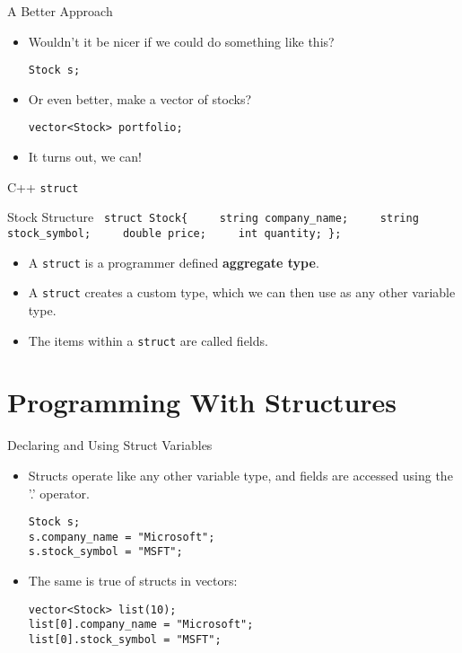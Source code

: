 \documentclass[]{beamer}
\begin{document}
\begin{frame}[fragile]{A Better Approach}
    \begin{itemize}
        \item Wouldn't it be nicer if we could do something like this?
        \begin{verbatim}
Stock s;
        \end{verbatim}
        \item Or even better, make a vector of stocks?
        \begin{verbatim}
vector<Stock> portfolio;
        \end{verbatim}
        \item It turns out, we can!
    \end{itemize}
\end{frame}

\begin{frame}[fragile]{C++ \texttt{struct}}

\begin{block}{Stock Structure}
{\tt
struct Stock\{
\newline\verb!    !string company\_name;
\newline\verb!    !string stock\_symbol;
\newline\verb!    !double price;
\newline\verb!    !int quantity;
\newline\};
}
\end{block}
\begin{itemize}[<+(2)->]
    \item A \texttt{struct} is a programmer defined \textbf{aggregate type}.
    \item A \texttt{struct} creates a custom type, which we can then use as any
        other variable type.
    \item The items within a \texttt{struct} are called fields.
\end{itemize}

\end{frame}

\section{Programming With Structures}

\begin{frame}[fragile]{Declaring and Using Struct Variables}
\begin{itemize}[<+->]
    \item Structs operate like any other variable type, and fields are
        accessed using the '.' operator.
        \begin{verbatim}
Stock s;
s.company_name = "Microsoft";
s.stock_symbol = "MSFT";
        \end{verbatim}
    \item The same is true of structs in vectors:
    \begin{verbatim}
vector<Stock> list(10);
list[0].company_name = "Microsoft";
list[0].stock_symbol = "MSFT";
    \end{verbatim}

\end{itemize}
\end{frame}
\end{document}

